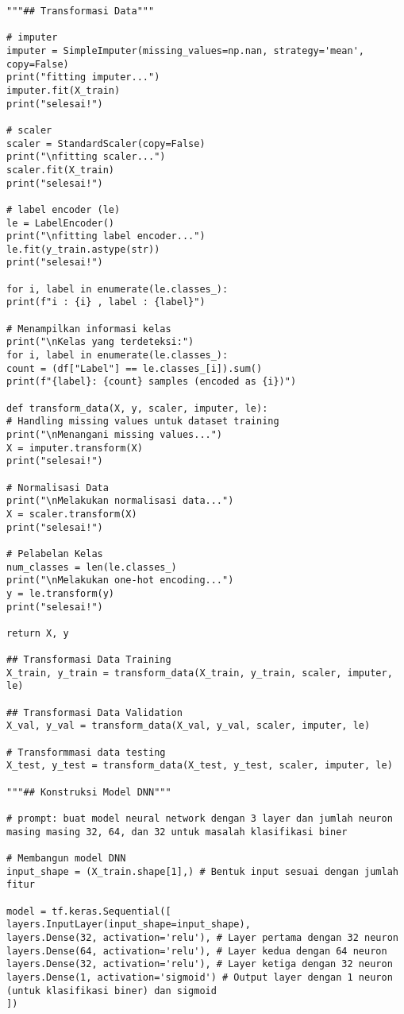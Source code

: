 \documentclass[a4paper,12pt]{report}
\begin{document}
\begin{lstlisting}
"""## Transformasi Data"""

# imputer
imputer = SimpleImputer(missing_values=np.nan, strategy='mean', copy=False)
print("fitting imputer...")
imputer.fit(X_train)
print("selesai!")

# scaler
scaler = StandardScaler(copy=False)
print("\nfitting scaler...")
scaler.fit(X_train)
print("selesai!")

# label encoder (le)
le = LabelEncoder()
print("\nfitting label encoder...")
le.fit(y_train.astype(str))
print("selesai!")

for i, label in enumerate(le.classes_):
print(f"i : {i} , label : {label}")

# Menampilkan informasi kelas
print("\nKelas yang terdeteksi:")
for i, label in enumerate(le.classes_):
count = (df["Label"] == le.classes_[i]).sum()
print(f"{label}: {count} samples (encoded as {i})")

def transform_data(X, y, scaler, imputer, le):
# Handling missing values untuk dataset training
print("\nMenangani missing values...")
X = imputer.transform(X)
print("selesai!")

# Normalisasi Data
print("\nMelakukan normalisasi data...")
X = scaler.transform(X)
print("selesai!")

# Pelabelan Kelas
num_classes = len(le.classes_)
print("\nMelakukan one-hot encoding...")
y = le.transform(y)
print("selesai!")

return X, y

## Transformasi Data Training
X_train, y_train = transform_data(X_train, y_train, scaler, imputer, le)

## Transformasi Data Validation
X_val, y_val = transform_data(X_val, y_val, scaler, imputer, le)

# Transformmasi data testing
X_test, y_test = transform_data(X_test, y_test, scaler, imputer, le)

"""## Konstruksi Model DNN"""

# prompt: buat model neural network dengan 3 layer dan jumlah neuron masing masing 32, 64, dan 32 untuk masalah klasifikasi biner

# Membangun model DNN
input_shape = (X_train.shape[1],) # Bentuk input sesuai dengan jumlah fitur

model = tf.keras.Sequential([
layers.InputLayer(input_shape=input_shape),
layers.Dense(32, activation='relu'), # Layer pertama dengan 32 neuron
layers.Dense(64, activation='relu'), # Layer kedua dengan 64 neuron
layers.Dense(32, activation='relu'), # Layer ketiga dengan 32 neuron
layers.Dense(1, activation='sigmoid') # Output layer dengan 1 neuron (untuk klasifikasi biner) dan sigmoid
])


\end{lstlisting}
\end{document}
